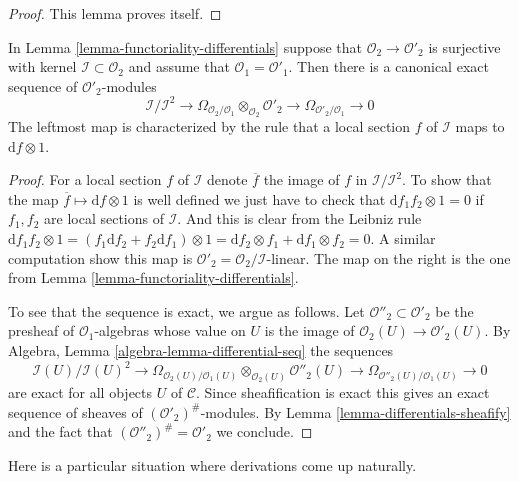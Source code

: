 \begin{proof}
This lemma proves itself.
\end{proof}

\begin{lemma}
\label{lemma-differential-seq}
In Lemma \ref{lemma-functoriality-differentials} suppose that
$\mathcal{O}_2 \to \mathcal{O}'_2$ is surjective with kernel
$\mathcal{I} \subset \mathcal{O}_2$ and assume that
$\mathcal{O}_1 = \mathcal{O}'_1$. Then there is a canonical exact
sequence of $\mathcal{O}'_2$-modules
$$
\mathcal{I}/\mathcal{I}^2
\longrightarrow
\Omega_{\mathcal{O}_2/\mathcal{O}_1} \otimes_{\mathcal{O}_2} \mathcal{O}'_2
\longrightarrow
\Omega_{\mathcal{O}'_2/\mathcal{O}_1}
\longrightarrow
0
$$
The leftmost map is characterized by the rule that a local section
$f$ of $\mathcal{I}$ maps to $\text{d}f \otimes 1$.
\end{lemma}

\begin{proof}
For a local section $f$ of $\mathcal{I}$ denote $\overline{f}$ the image of
$f$ in $\mathcal{I}/\mathcal{I}^2$. To show that the map
$\overline{f} \mapsto \text{d}f \otimes 1$ is well defined we just have to
check that $\text{d} f_1f_2 \otimes 1 = 0$ if $f_1, f_2$ are local sections
of $\mathcal{I}$. And this is clear from the Leibniz rule
$\text{d} f_1f_2 \otimes 1 =
(f_1 \text{d}f_2 + f_2 \text{d} f_1 )\otimes 1 =
\text{d}f_2 \otimes f_1 + \text{d}f_1 \otimes f_2 = 0$.
A similar computation show this map is
$\mathcal{O}'_2 = \mathcal{O}_2/\mathcal{I}$-linear. The map on the right
is the one from Lemma \ref{lemma-functoriality-differentials}.

\medskip\noindent
To see that the sequence is exact, we argue as follows. Let
$\mathcal{O}''_2 \subset \mathcal{O}'_2$ be the presheaf of
$\mathcal{O}_1$-algebras whose value on $U$ is the image of
$\mathcal{O}_2(U) \to \mathcal{O}'_2(U)$. By
Algebra, Lemma \ref{algebra-lemma-differential-seq}
the sequences
$$
\mathcal{I}(U)/\mathcal{I}(U)^2
\longrightarrow
\Omega_{\mathcal{O}_2(U)/\mathcal{O}_1(U)}
\otimes_{\mathcal{O}_2(U)} \mathcal{O}''_2(U)
\longrightarrow
\Omega_{\mathcal{O}''_2(U)/\mathcal{O}_1(U)}
\longrightarrow
0
$$
are exact for all objects $U$ of $\mathcal{C}$. Since sheafification is
exact this gives an exact sequence of sheaves of
$(\mathcal{O}'_2)^\#$-modules.
By Lemma \ref{lemma-differentials-sheafify}
and the fact that $(\mathcal{O}''_2)^\# = \mathcal{O}'_2$
we conclude.
\end{proof}

\noindent
Here is a particular situation where derivations come up
naturally.

